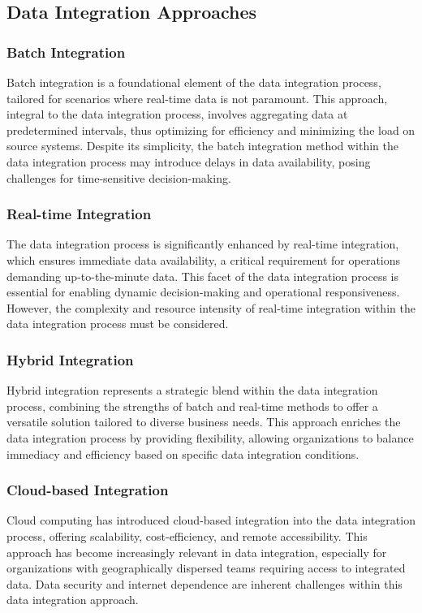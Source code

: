 \documentclass[12pt]{book}
\begin{document}
\subsection{Data Integration Approaches}
\subsubsection{Batch Integration}
Batch integration is a foundational element of the data integration process, tailored for scenarios where real-time data is not paramount. This approach, integral to the data integration process, involves aggregating data at predetermined intervals, thus optimizing for efficiency and minimizing the load on source systems. Despite its simplicity, the batch integration method within the data integration process may introduce delays in data availability, posing challenges for time-sensitive decision-making.

\subsubsection{Real-time Integration}
The data integration process is significantly enhanced by real-time integration, which ensures immediate data availability, a critical requirement for operations demanding up-to-the-minute data. This facet of the data integration process is essential for enabling dynamic decision-making and operational responsiveness. However, the complexity and resource intensity of real-time integration within the data integration process must be considered.

\subsubsection{Hybrid Integration}
Hybrid integration represents a strategic blend within the data integration process, combining the strengths of batch and real-time methods to offer a versatile solution tailored to diverse business needs. This approach enriches the data integration process by providing flexibility, allowing organizations to balance immediacy and efficiency based on specific data integration conditions.

\subsubsection{Cloud-based Integration}
Cloud computing has introduced cloud-based integration into the data integration process, offering scalability, cost-efficiency, and remote accessibility. This approach has become increasingly relevant in data integration, especially for organizations with geographically dispersed teams requiring access to integrated data. Data security and internet dependence are inherent challenges within this data integration approach.
\end{document}
